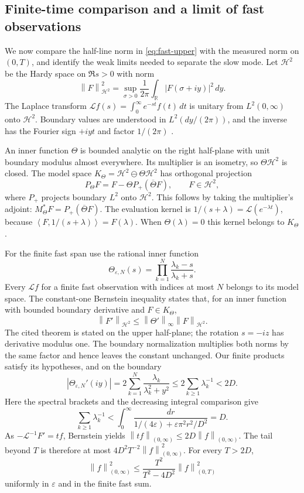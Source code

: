 \documentclass[11pt]{article}
\numberwithin{equation}{section}
\newcommand{\eps}{\varepsilon}
\newcommand{\HH}{\mathcal H^2}
\newcommand{\LL}{\mathcal L}
\newcommand{\norm}[1]{\left\|#1\right\|}
\newcommand{\ip}[2]{\left\langle #1,#2\right\rangle}
\begin{document}
\subsection{Finite-time comparison and a limit of fast observations}
\label{sec:Hardy}

We now compare the half-line norm in \eqref{eq:fast-upper} with the
measured norm on $(0,T)$, and identify the weak limits needed to separate
the slow mode. Let $\HH$ be the Hardy space on $\Re s>0$ with norm
\[
 \norm F_{\HH}^2=\sup_{\sigma>0}\frac1{2\pi}
                         \int_{\mathbb R}|F(\sigma+iy)|^2\,dy.
\]
The Laplace transform
$\LL f(s)=\int_0^\infty e^{-st}f(t)\,dt$
is unitary from $L^2(0,\infty)$ onto $\HH$.
Boundary values are understood in $L^2(dy/(2\pi))$, and the inverse
has the Fourier sign $+iyt$ and factor $1/(2\pi)$
\cite[Propositions 3.4--3.5]{KoikeLaheurte}.

An inner function $\Theta$ is bounded analytic on the right half-plane
with unit boundary modulus almost everywhere.
Its multiplier is an isometry, so $\Theta\HH$ is closed.
The model space $K_\Theta=\HH\ominus\Theta\HH$ has orthogonal projection
\begin{equation}\label{eq:projection}
 P_\Theta F=F-\Theta P_+(\overline\Theta F),\qquad F\in\HH,
\end{equation}
where $P_+$ projects boundary $L^2$ onto $\HH$.
This follows by taking the multiplier's adjoint:
$M_\Theta^*F=P_+(\overline\Theta F)$.
The evaluation kernel is $1/(s+\lambda)=\LL(e^{-\lambda t})$,
because $\ip F{1/(s+\lambda)}=F(\lambda)$.
When $\Theta(\lambda)=0$ this kernel belongs to $K_\Theta$.

For the finite fast span use the rational inner function
\[
 \Theta_{\eps,N}(s)=\prod_{k=1}^N\frac{\lambda_k-s}{\lambda_k+s}.
\]
Every $\LL f$ for a finite fast observation with indices at most $N$
belongs to its model space.
The constant-one Bernstein inequality
\cite[Theorem 5.2]{BaranovEtAl} states that, for an inner function
with bounded boundary derivative and $F\in K_\Theta$,
\[
 \norm{F'}_{\HH}\le\norm{\Theta'}_\infty\norm F_{\HH}.
\]
The cited theorem is stated on the upper half-plane; the rotation
$s=-iz$ has derivative modulus one. The boundary normalization multiplies
both norms by the same factor and hence leaves the constant unchanged.
Our finite products satisfy its hypotheses, and on the boundary
\[
 |\Theta_{\eps,N}'(iy)|
    =2\sum_{k=1}^N\frac{\lambda_k}{\lambda_k^2+y^2}
    \le2\sum_{k\ge1}\lambda_k^{-1}<2D.
\]
Here the spectral brackets and the decreasing integral comparison give
\begin{equation}\label{eq:sum}
 \sum_{k\ge1}\lambda_k^{-1}
 <\int_0^\infty
     \frac{dr}{1/(4\eps)+\eps\pi^2r^2/D^2}=D.
\end{equation}
As $-\LL^{-1}F'=tf$, Bernstein yields
$\norm{tf}_{(0,\infty)}\le2D\norm f_{(0,\infty)}$.
The tail beyond $T$ is therefore at most
$4D^2T^{-2}\norm f_{(0,\infty)}^2$.
For every $T>2D$,
\begin{equation}\label{eq:comparison}
 \norm f_{(0,\infty)}^2
    \le\frac{T^2}{T^2-4D^2}\norm f_{(0,T)}^2
\end{equation}
uniformly in $\eps$ and in the finite fast sum.
\end{document}
